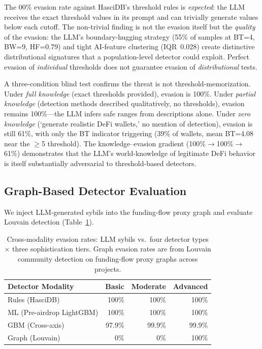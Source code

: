 \documentclass[sigconf,nonacm=false]{acmart}
\begin{document}
The \evasionThresholdRules{}00\% evasion rate against HasciDB's threshold rules is \emph{expected}: the LLM receives the exact threshold values in its prompt and can trivially generate values below each cutoff. The non-trivial finding is not the evasion itself but the \emph{quality} of the evasion: the LLM's boundary-hugging strategy (55\% of samples at BT=4, BW=9, HF=0.79) and tight AI-feature clustering (IQR~0.028) create distinctive distributional signatures that a population-level detector could exploit. Perfect evasion of \emph{individual} thresholds does not guarantee evasion of \emph{distributional} tests.

A three-condition blind test confirms the threat is not threshold-memorization. Under \emph{full knowledge} (exact thresholds provided), evasion is 100\%. Under \emph{partial knowledge} (detection methods described qualitatively, no thresholds), evasion remains 100\%---the LLM infers safe ranges from descriptions alone. Under \emph{zero knowledge} (`generate realistic DeFi wallets,' no mention of detection), evasion is still 61\%, with only the BT indicator triggering (39\% of wallets, mean BT=4.08 near the $\geq$5 threshold). The knowledge--evasion gradient (100\%$\to$100\%$\to$61\%) demonstrates that the LLM's world-knowledge of legitimate DeFi behavior is itself substantially adversarial to threshold-based detectors.

\subsection{Graph-Based Detector Evaluation}
\label{sec:graph}

We inject LLM-generated sybils into the funding-flow proxy graph and evaluate Louvain detection (Table~\ref{tab:graph_evasion}).

\begin{table}[t]
\caption{Cross-modality evasion rates: LLM sybils vs.\ four detector types $\times$ three sophistication tiers. Graph evasion rates are from Louvain community detection on funding-flow proxy graphs across \largeScaleNProjects{} projects.}
\label{tab:graph_evasion}
\small
\begin{tabular}{lrrr}
\toprule
Detector Modality & Basic & Moderate & Advanced \\
\midrule
Rules (HasciDB)          & 100\%  & 100\%  & 100\%  \\
ML (Pre-airdrop LightGBM) & 100\%  & 100\%  & 100\%  \\
GBM (Cross-axis)         & 97.9\% & 99.9\% & 99.9\% \\
Graph (Louvain)          & \evasionGraphBasic{}0\% & \evasionGraphModerate{}0\% & 100\%  \\
\bottomrule
\end{tabular}
\end{table}
\end{document}
